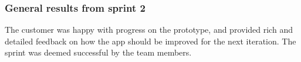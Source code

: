 \subsubsection{General results from sprint 2} The customer was happy with
progress on the prototype, and provided rich and detailed feedback on how the
app should be improved for the next iteration. The sprint was deemed successful
by the team members.
